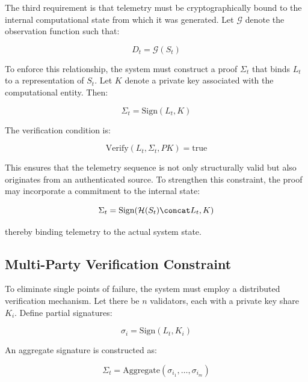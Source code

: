 The third requirement is that telemetry must be cryptographically bound to the internal computational state from which it was generated. Let $\mathcal{G}$ denote the observation function such that:

\begin{equation}
D_t = \mathcal{G}(S_t)
\end{equation}

To enforce this relationship, the system must construct a proof $\Sigma_t$ that binds $L_t$ to a representation of $S_t$. Let $K$ denote a private key associated with the computational entity. Then:

\begin{equation}
\Sigma_t = \text{Sign}(L_t, K)
\end{equation}

The verification condition is:

\begin{equation}
\text{Verify}(L_t, \Sigma_t, PK) = \text{true}
\end{equation}

This ensures that the telemetry sequence is not only structurally valid but also originates from an authenticated source. To strengthen this constraint, the proof may incorporate a commitment to the internal state:

\begin{equation}
\Sigma_t = \text{Sign}(\mathcal{H}(S_t) \concat L_t, K)
\end{equation}

thereby binding telemetry to the actual system state.

\subsection{Multi-Party Verification Constraint}

To eliminate single points of failure, the system must employ a distributed verification mechanism. Let there be $n$ validators, each with a private key share $K_i$. Define partial signatures:

\begin{equation}
\sigma_i = \text{Sign}(L_t, K_i)
\end{equation}

An aggregate signature is constructed as:

\begin{equation}
\Sigma_t = \text{Aggregate}(\sigma_{i_1}, \dots, \sigma_{i_m})
\end{equation}

